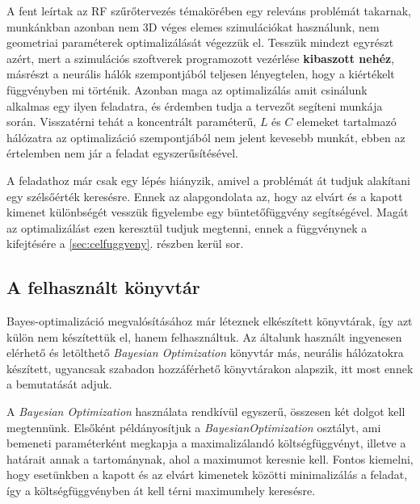 		A fent leírtak az RF szűrőtervezés témakörében egy releváns problémát takarnak, munkánkban azonban nem 3D véges elemes szimulációkat használunk, nem geometriai paraméterek optimalizálását végezzük el. Tesszük mindezt egyrészt azért, mert a szimulációs szoftverek programozott vezérlése \textbf{kibaszott nehéz}, másrészt a neurális hálók szempontjából teljesen lényegtelen, hogy a kiértékelt függvényben mi történik. Azonban maga az optimalizálás amit csinálunk alkalmas egy ilyen feladatra, és érdemben tudja a tervezőt segíteni munkája során. Visszatérni tehát a koncentrált paraméterű, $L$ és $C$ elemeket tartalmazó hálózatra az optimalizáció szempontjából nem jelent kevesebb munkát, ebben az értelemben nem jár a feladat egyszerűsítésével.
		
		A feladathoz már csak egy lépés hiányzik, amivel a problémát át tudjuk alakítani egy szélsőérték keresésre. Ennek az alapgondolata az, hogy az elvárt és a kapott kimenet különbségét vesszük figyelembe egy büntetőfüggvény segítségével. Magát az optimalizálást ezen keresztül tudjuk megtenni, ennek a függvénynek a kifejtésére a \ref{sec:celfuggveny}. részben kerül sor.
		
	\subsection{A felhasznált könyvtár}
	
		Bayes-optimalizáció megvalósításához már léteznek elkészített könyvtárak, így azt külön nem készítettük el, hanem felhasználtuk. Az általunk használt ingyenesen elérhető és letölthető \textit{Bayesian Optimization} könyvtár más, neurális hálózatokra készített, ugyancsak szabadon hozzáférhető könyvtárakon alapszik, itt most ennek a bemutatását adjuk.
		
		A \textit{Bayesian Optimization} használata rendkívül egyszerű, összesen két dolgot kell megtennünk. Elsőként példányosítjuk a \textit{BayesianOptimization} osztályt, ami bemeneti paraméterként megkapja a maximalizálandó költségfüggvényt, illetve a határait annak a tartománynak, ahol a maximumot keresnie kell. Fontos kiemelni, hogy esetünkben a kapott és az elvárt kimenetek közötti minimalizálás a feladat, így a költségfüggvényben át kell térni maximumhely keresésre. 
		
